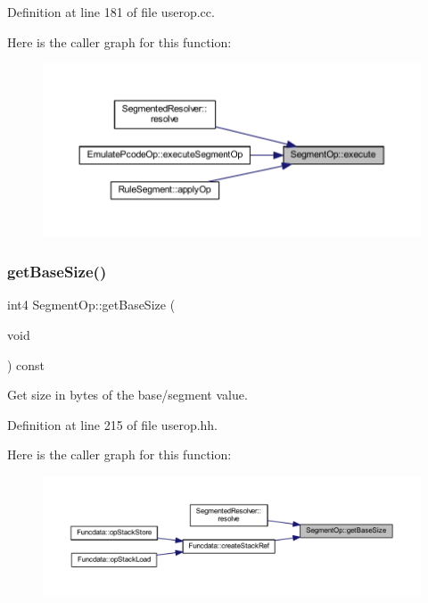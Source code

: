 Definition at line 181 of file userop.\+cc.

Here is the caller graph for this function\+:
\nopagebreak
\begin{figure}[H]
\begin{center}
\leavevmode
\includegraphics[width=350pt]{class_segment_op_a1857d8c2eef84b0a8c1bb7c624210c6c_icgraph}
\end{center}
\end{figure}
\mbox{\label{class_segment_op_adb895dfc740733c7106f3752bc4c6c1c}} 
\subsubsection{\texorpdfstring{getBaseSize()}{getBaseSize()}}
{\footnotesize\ttfamily int4 Segment\+Op\+::get\+Base\+Size (\begin{DoxyParamCaption}\item[{void}]{ }\end{DoxyParamCaption}) const\hspace{0.3cm}{\ttfamily [inline]}}



Get size in bytes of the base/segment value. 



Definition at line 215 of file userop.\+hh.

Here is the caller graph for this function\+:
\nopagebreak
\begin{figure}[H]
\begin{center}
\leavevmode
\includegraphics[width=350pt]{class_segment_op_adb895dfc740733c7106f3752bc4c6c1c_icgraph}
\end{center}
\end{figure}
\mbox{\label{class_segment_op_a5b186649dadd3ed754fdfe26ba84c96b}} 
